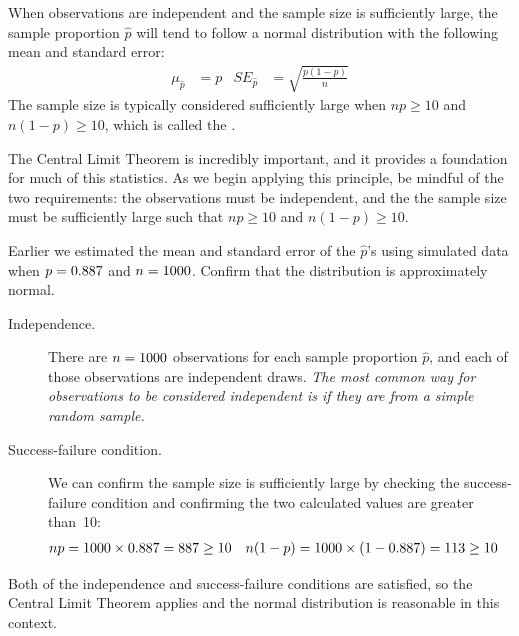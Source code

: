 \begin{termBox}{
When observations are independent and the sample size is
sufficiently large, the sample proportion $\hat{p}$ will tend
to follow a normal distribution with the following mean and
standard error:
\begin{align*}
  \mu_{\hat{p}} &= p
  &SE_{\hat{p}} &= \sqrt{\frac{p (1 - p)}{n}}
\end{align*}
The sample size is typically considered sufficiently large when
$np \geq 10$ and $n(1-p) \geq 10$, which is called the
.} %
\end{termBox}

The Central Limit Theorem is incredibly important, and it provides
a foundation for much of this statistics. As we begin applying
this principle, be mindful of the two requirements:
the observations must be independent, and the the sample size must
be sufficiently large such that $np \geq 10$ and $n(1-p) \geq 10$.

\begin{example}{Earlier we estimated the mean and standard
error of the $\hat{p}$'s using simulated data when
$p = 0.887{}$ and $n = 1000{}$.
Confirm that the distribution is approximately
normal.}\label{sample_p887_n1000_confirm_normal}
\begin{description}
\item[Independence.] There are $n = 1000{}$
    observations for each
    sample proportion $\hat{p}$, and each of those observations
    are independent draws. \emph{The most common way for
    observations to be considered independent is if they are from
    a simple random sample.}
\item[Success-failure condition.] We can confirm the sample size
    is sufficiently large by checking the success-failure condition
    and confirming the two calculated values are greater than~10:
    \begin{align*}
    np &= 1000{} \times 0.887{}
        = 887{}
        \geq 10
    &n(1-p) &= 1000{} \times (1 - 0.887{})
        = 113{}
        \geq 10
    \end{align*}
\end{description}
Both of the independence and success-failure conditions are
satisfied, so the Central Limit Theorem applies and the normal
distribution is reasonable in this context.
\end{example}


